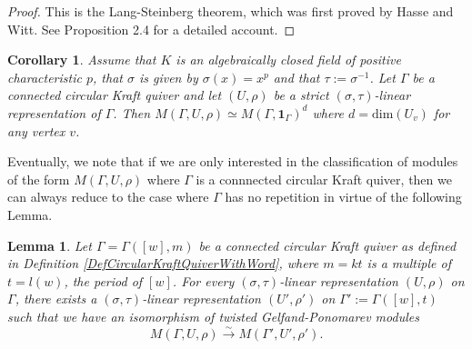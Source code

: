 \documentclass[12pt]{amsart}
\newtheorem{lemma}[theorem]{Lemma}
\newtheorem{corollary}[theorem]{Corollary}
\theoremstyle{definition}
\newcommand{\<}{\langle}   %
\renewcommand{\>}{\rangle} %
\begin{document}
\begin{proof}
    This is the Lang-Steinberg theorem, which was first proved by Hasse and Witt. See \cite{chai:kraft2025} Proposition 2.4 for a detailed account. 
\end{proof}

\begin{corollary}\label{ModulesAttachedToCircularKraftQuiverAlgCl}
    Assume that $K$ is an algebraically closed field of positive characteristic $p$, that $\sigma$ is given by $\sigma(x) = x^p$ and that $\tau := \sigma^{-1}$. Let $\Gamma$ be a connected circular Kraft quiver and let $(U,\rho)$ be a strict $(\sigma,\tau)$-linear representation of $\Gamma$. Then $M(\Gamma,U,\rho) \simeq M(\Gamma,\mathbf{1}_{\Gamma})^d$ where $d = \mathrm{dim}(U_v)$ for any vertex $v$.
\end{corollary}

Eventually, we note that if we are only interested in the classification of modules of the form $M(\Gamma,U,\rho)$ where $\Gamma$ is a connnected circular Kraft quiver, then we can always reduce to the case where $\Gamma$ has no repetition in virtue of the following Lemma.

\begin{lemma}\label{ReductionToCaseOfNonRepetition}
    Let $\Gamma = \Gamma([w],m)$ be a connected circular Kraft quiver as defined in Definition \ref{DefCircularKraftQuiverWithWord}, where $m = kt$ is a multiple of $t = l(w)$, the period of $[w]$. For every $(\sigma,\tau)$-linear representation $(U,\rho)$ on $\Gamma$, there exists a $(\sigma,\tau)$-linear representation $(U',\rho')$ on $\Gamma' := \Gamma([w],t)$ such that we have an isomorphism of twisted Gelfand-Ponomarev modules 
    \begin{equation*}
        M(\Gamma,U,\rho) \xrightarrow{\sim} M(\Gamma',U',\rho').
    \end{equation*}
\end{lemma}
\end{document}
